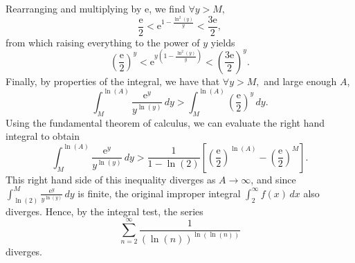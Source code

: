 \documentclass[
  12pt,
  a4paper]{extarticle}
\theoremstyle{plain}
\theoremstyle{definition}
\theoremstyle{plain}
\theoremstyle{plain}
\theoremstyle{plain}
\theoremstyle{plain}
\theoremstyle{definition}
\theoremstyle{definition}
\theoremstyle{remark}
\theoremstyle{remark}
\renewcommand{\;}{\,}
\begin{document}
Rearranging and multiplying by \(\mathrm{e}\), we find \(\forall y > M,\) \[\frac{\mathrm{e}}{2} < \mathrm{e}^{1 - \frac{\ln^2(y)}{y}} < \frac{3\mathrm{e}}{2},\] from which raising everything to the power of \(y\) yields \[\left(\frac{\mathrm{e}}{2}\right)^y < \mathrm{e}^{y\left(1 - \frac{\ln^2(y)}{y}\right)} < \left(\frac{3\mathrm{e}}{2}\right)^y.\] Finally, by properties of the integral, we have that \(\forall y > M,\) and large enough \(A\), \[\int_{M}^{\ln(A)}\frac{\mathrm{e}^y}{y^{\ln(y)}}\;dy > \int_M^{\ln(A)}\left(\frac{\mathrm{e}}{2}\right)^y\;dy.\] Using the fundamental theorem of calculus, we can evaluate the right hand integral to obtain \[\int_{M}^{\ln(A)}\frac{\mathrm{e}^y}{y^{\ln(y)}}\;dy > \frac{1}{1 - \ln(2)}\left[\left(\frac{\mathrm{e}}{2}\right)^{\ln(A)} - \left(\frac{\mathrm{e}}{2}\right)^{M} \right].\] This right hand side of this inequality diverges as \(A \to \infty\), and since \(\int_{\ln(2)}^M \frac{\mathrm{e}^y}{y^{\ln(y)}}\;dy\) is finite, the original improper integral \(\int_{2}^{\infty} f(x)\;dx\) also diverges. Hence, by the integral test, the series \[\sum_{n=2}^{\infty}\frac{1}{(\ln(n))^{\ln(\ln(n))}}\] diverges.
\end{document}
